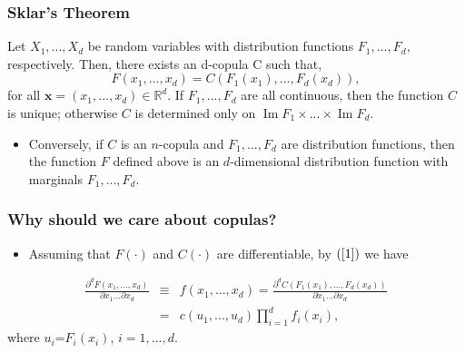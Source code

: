 \documentclass[pdf,9pt,xcolor=dvipsnames,hide notes]{beamer}
\DeclareMathOperator{\Ima}{Im}
\begin{document}
		\begin{frame}[label=frame1c2]
	\frametitle{Sklar's Theorem}
	
	
\begin{theorem}
	Let $X_{1},...,X_{d}$ be random variables with distribution functions $F_{1},...,F_{d}$, respectively. Then, there exists an d-copula C such that,
	\begin{equation}
	F\left( x_{1},...,x_{d}\right) =C\left( F_{1}\left( x_{1}\right)
	,...,F_{d}\left( x_{d}\right) \right) ,  \label{1} 
	\end{equation}
\noindent for all $\mathbf{x}=\left( x_{1},...,x_{d}\right) \in
\mathbb{R}^{d}$. If $F_{1},...,F_{d}$ are all continuous, then the function $C$ is unique; otherwise $C$ is determined only on $\Ima F_{1}\times ...\times \Ima F_{d}$. 
\end{theorem}

\begin{itemize}
	\item Conversely, if $C$ is an $n$-copula and $F_{1},...,F_{d}$ are distribution functions, then the function $F$ defined above is an $d$-dimensional distribution function with marginals $F_{1},...,F_{d}$.
\end{itemize}

\end{frame}

\begin{frame}[label=frame2]
\frametitle{Why should we care about copulas?}

	\begin{itemize}
		\justifying
		
		\item Assuming that $F\left( \cdot \right) $ and $C\left( \cdot
		\right) $ are differentiable, by $\left( \ref{1}\right)$ we have
		
	\end{itemize}
	
	\begin{eqnarray}
	\frac{\partial ^{d}F\left( x_{1},...,x_{d}\right) }{\partial
		x_{1}...\partial x_{d}} &\equiv &f\left( x_{1},...,x_{d}\right) =\frac{
		\partial ^{d}C\left( F_{1}\left( x_{1}\right) ,...,F_{d}\left( x_{d}\right)
		\right) }{\partial x_{1}...\partial x_{d}} \\
	&=&c\left( u_{1},...,u_{d}\right) \prod_{i=1}^{d}f_{i}\left( x_{i}\right),
	\label{23}
	\end{eqnarray}%
	where $u_{i}$=$F_{i}\left( x_{i}\right) $, $i=1,...,d$.
	
\end{frame}
\end{document}
